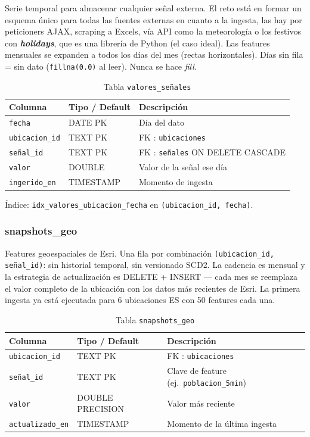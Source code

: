 \documentclass[12pt, a4paper]{article}
\begin{document}
Serie temporal  para almacenar cualquier señal externa. El reto está en formar un esquema único para todas las fuentes externas en cuanto a la ingesta, las hay por peticioners AJAX,   scraping a Excels, vía API como la meteorología o los festivos con \textit{\textbf{holidays}}, que es una librería de Python (el caso ideal). Las features mensuales se expanden a todos los días del mes (rectas horizontales). Días sin fila = sin dato (\texttt{fillna(0.0)} al leer). Nunca se hace \textit{fill}.

\begin{table}[H]
\centering
\renewcommand{\arraystretch}{1.2}
\begin{tabular}{llp{5.5cm}}
\toprule
\textbf{Columna} & \textbf{Tipo / Default} & \textbf{Descripción} \\
\midrule
\texttt{fecha}        & DATE PK   & Día del dato \\
\texttt{ubicacion\_id} & TEXT PK  & FK : \texttt{ubicaciones} \\
\texttt{señal\_id}    & TEXT PK   & FK : \texttt{señales} ON DELETE CASCADE \\
\texttt{valor}        & DOUBLE    & Valor de la señal ese día \\
\texttt{ingerido\_en} & TIMESTAMP & Momento de ingesta \\
\bottomrule
\end{tabular}
\caption{Tabla \texttt{valores\_señales}}
\end{table}

Índice: \texttt{idx\_valores\_ubicacion\_fecha} en \texttt{(ubicacion\_id, fecha)}.

\subsubsection{snapshots\_geo}

Features geoespaciales de Esri. Una fila por combinación \texttt{(ubicacion\_id, señal\_id)}: sin historial temporal, sin versionado SCD2. La cadencia es mensual y la estrategia de actualización es DELETE + INSERT — cada mes se reemplaza el valor completo de la ubicación con los datos más recientes de Esri. La primera ingesta ya está ejecutada para 6 ubicaciones ES con 50 features cada una.

\begin{table}[H]
\centering
\renewcommand{\arraystretch}{1.2}
\begin{tabular}{llp{5.5cm}}
\toprule
\textbf{Columna} & \textbf{Tipo / Default} & \textbf{Descripción} \\
\midrule
\texttt{ubicacion\_id}   & TEXT PK    & FK : \texttt{ubicaciones} \\
\texttt{señal\_id}       & TEXT PK    & Clave de feature (ej.\ \texttt{poblacion\_5min}) \\
\texttt{valor}           & DOUBLE PRECISION & Valor más reciente \\
\texttt{actualizado\_en} & TIMESTAMP  & Momento de la última ingesta \\
\bottomrule
\end{tabular}
\caption{Tabla \texttt{snapshots\_geo}}
\end{table}
\end{document}
